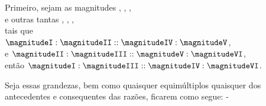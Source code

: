 \documentclass[booklanguage=brazilian]{byrnebook}
\begin{document}
\begin{center}
Primeiro, sejam as magnitudes , , ,\\
e outras tantas , , ,\\
tais que\\
$\magnitudeI : \magnitudeII :: \magnitudeIV : \magnitudeV$,\\
e $\magnitudeII : \magnitudeIII :: \magnitudeV : \magnitudeVI$,\\
então $\magnitudeI : \magnitudeIII :: \magnitudeIV : \magnitudeVI$.\\
\end{center}

Seja essas grandezas, bem como quaisquer equimúltiplos quaisquer dos antecedentes e consequentes das razões, ficarem como segue: -
\end{document}
